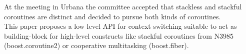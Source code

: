 At the meeting in Urbana the committee accepted that stackless and stackful
coroutines are distinct and decided to pursue both kinds of coroutines.\\
This paper proposes a low-level API for context switching suitable to act as 
building-block for high-level constructs like stackful coroutines from
N3985\cite{N3985} (boost.coroutine2\cite{bcoroutine2}) or cooperative
multitasking (boost.fiber\cite{bfiber}).\\
